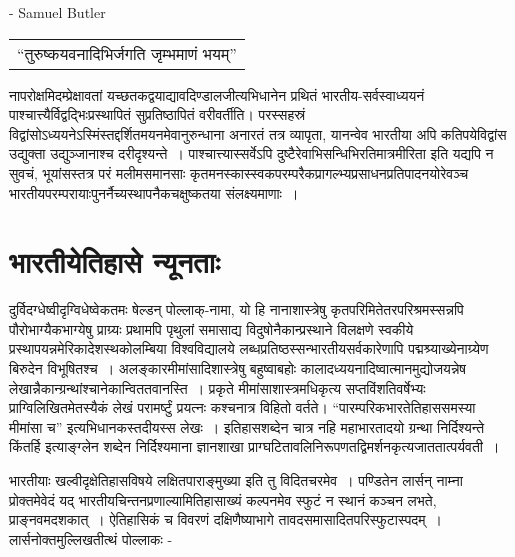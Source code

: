 \hfill - Samuel Butler

\begin{center}
\begin{tabular}{l}
“तुरुष्कयवनादिभिर्जगति जृम्भमाणं भयम्”
\end{tabular}
\end{center}

नापरोक्षमिदम्प्रेक्षावतां यच्छतकद्वयाद्यावदिण्डालजीत्यभिधानेन प्रथितं भारतीय-सर्वस्वाध्ययनं पाश्चात्त्यैर्विद्वद्भिःप्रस्थापितं सुप्रतिष्ठापितं वरीवर्तीति। परस्सहस्रं विद्वांसोऽध्ययनेऽस्मिंस्तद्दर्शितमयनमेवानुरुन्धाना अनारतं तत्र व्यापृता, यानन्वेव भारतीया अपि कतिपये\break विद्वांस उद्युक्ता उद्युञ्जानाश्च दरीदृश्यन्ते~। पाश्चात्त्यास्सर्वेऽपि दुष्टैरेवाभिसन्धिभिरतिमात्रमीरिता इति यद्यपि न सुवचं, भूयांसस्तत्र परं मलीमसमानसाः कृतमनस्कास्स्वकपरम्परैकप्रागल्भ्यप्रसाधनप्रतिपादनयोरेवञ्च भारतीयपरम्परायाःपुनर्नैच्यस्थापनैकचक्षुष्कतया संलक्ष्यमाणाः~।

\section*{भारतीयेतिहासे न्यूनताः}

दुर्विदग्धेष्वीदृग्विधेष्वेकतमः षेल्डन् पोल्लाक्-नामा, यो हि नानाशास्त्रेषु कृतपरिमितेतरपरिश्रमस्सन्नपि पौरोभाग्यैकभाग्येषु प्राग्र्यः प्रथामपि पृथुलां समासाद्य विदुषो\break नैकान्प्रस्थाने विलक्षणे स्वकीये प्रस्थापयन्नमेरिकादेशस्थकोलम्बिया विश्वविद्यालये लब्धप्रतिष्ठस्सन्भारतीयसर्वकारेणापि पद्मश्र्याख्येनाग्र्येण बिरुदेन विभूषितश्च~। अलङ्कारमीमांसादिशास्त्रेषु बहुष्वाबहोः कालादध्ययनादिष्वात्मानमुद्योजयन्नेष लेखान्नैकान्ग्रन्थांश्चानेकान्विततवानस्ति~। प्रकृते मीमांसाशास्त्रमधिकृत्य सप्तविंशतिवर्षेभ्यः प्राग्विलिखितमेतस्यैकं लेखं परामर्ष्टुं प्रयत्नः कश्चनात्र विहितो वर्तते। “पारम्परिकभारतेतिहाससमस्या मीमांसा च”  इत्यभिधानकस्तदीयस्स लेखः~। इतिहासशब्देन चात्र नहि महाभारतादयो ग्रन्था निर्दिश्यन्ते किंतर्हि  इत्याङ्ग्लेन शब्देन निर्दिश्यमाना ज्ञानशाखा प्राग्घटितावलिनिरूपणतद्विमर्शनकृत्यजाततात्पर्यवती~।

भारतीयाः खल्वीदृक्षेतिहासविषये लक्षितपाराङ्मुख्या इति तु विदितचरमेव~। पण्डितेन लार्सन् नाम्ना प्रोक्तमेवेदं यद् भारतीयचिन्तनप्रणाल्यामितिहासाख्यं कल्पनमेव स्फुटं न स्थानं कञ्चन लभते, प्राङ्नवमदशकात्~। ऐतिहासिकं च विवरणं दक्षिणैष्याभागे तावदसमासादितपरिस्फुटास्पदम्~। लार्सनोक्तमुल्लिखतीत्थं पोल्लाकः -

